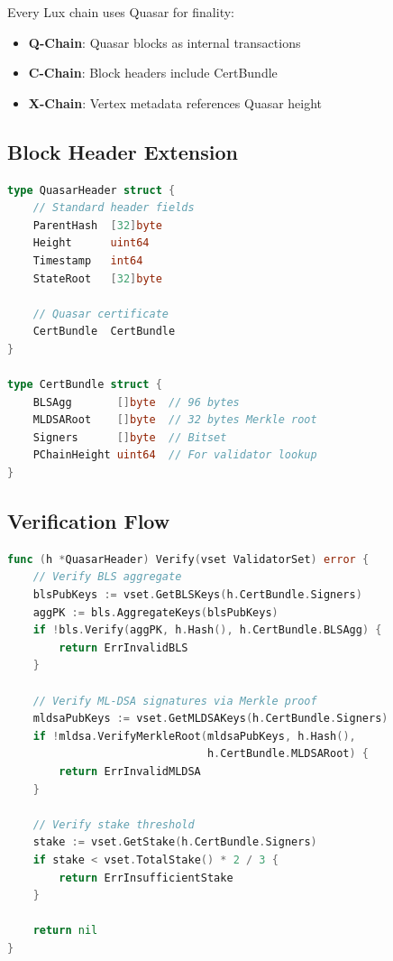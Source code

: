 \documentclass[11pt,a4paper]{article}
\begin{document}
Every Lux chain uses Quasar for finality:

\begin{itemize}
    \item \textbf{Q-Chain}: Quasar blocks as internal transactions
    \item \textbf{C-Chain}: Block headers include CertBundle
    \item \textbf{X-Chain}: Vertex metadata references Quasar height
\end{itemize}

\subsection{Block Header Extension}

\begin{lstlisting}[language=Go,basicstyle=\small\ttfamily]
type QuasarHeader struct {
    // Standard header fields
    ParentHash  [32]byte
    Height      uint64
    Timestamp   int64
    StateRoot   [32]byte

    // Quasar certificate
    CertBundle  CertBundle
}

type CertBundle struct {
    BLSAgg       []byte  // 96 bytes
    MLDSARoot    []byte  // 32 bytes Merkle root
    Signers      []byte  // Bitset
    PChainHeight uint64  // For validator lookup
}
\end{lstlisting}

\subsection{Verification Flow}

\begin{lstlisting}[language=Go,basicstyle=\small\ttfamily]
func (h *QuasarHeader) Verify(vset ValidatorSet) error {
    // Verify BLS aggregate
    blsPubKeys := vset.GetBLSKeys(h.CertBundle.Signers)
    aggPK := bls.AggregateKeys(blsPubKeys)
    if !bls.Verify(aggPK, h.Hash(), h.CertBundle.BLSAgg) {
        return ErrInvalidBLS
    }

    // Verify ML-DSA signatures via Merkle proof
    mldsaPubKeys := vset.GetMLDSAKeys(h.CertBundle.Signers)
    if !mldsa.VerifyMerkleRoot(mldsaPubKeys, h.Hash(),
                               h.CertBundle.MLDSARoot) {
        return ErrInvalidMLDSA
    }

    // Verify stake threshold
    stake := vset.GetStake(h.CertBundle.Signers)
    if stake < vset.TotalStake() * 2 / 3 {
        return ErrInsufficientStake
    }

    return nil
}
\end{lstlisting}
\end{document}

